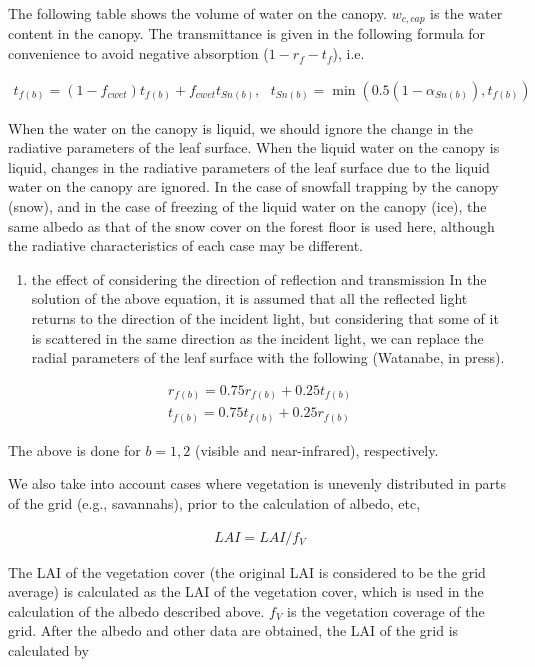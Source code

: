 The following table shows the volume of water on the canopy.
\(w_{c,cap}\) is the water content in the canopy. The transmittance is
given in the following formula for convenience to avoid negative
absorption (\(1-r_f-t_f\)), i.e.

\begin{eqnarray}
 t_{f(b)} = ( 1 - f_{cwet} ) t_{f(b)}
         + f_{cwet} t_{Sn(b)}, \ \ \
 t_{Sn(b)} = \min( 0.5(1 - \alpha_{Sn(b)}), t_{f(b)} )
\end{eqnarray}

When the water on the canopy is liquid, we should ignore the change in
the radiative parameters of the leaf surface. When the liquid water on
the canopy is liquid, changes in the radiative parameters of the leaf
surface due to the liquid water on the canopy are ignored. In the case
of snowfall trapping by the canopy (snow), and in the case of freezing
of the liquid water on the canopy (ice), the same albedo as that of the
snow cover on the forest floor is used here, although the radiative
characteristics of each case may be different.

\begin{enumerate}
\def\labelenumi{\arabic{enumi}.}
\setcounter{enumi}{1}
\tightlist
\item
  the effect of considering the direction of reflection and transmission
  In the solution of the above equation, it is assumed that all the
  reflected light returns to the direction of the incident light, but
  considering that some of it is scattered in the same direction as the
  incident light, we can replace the radial parameters of the leaf
  surface with the following (Watanabe, in press).
\end{enumerate}

\begin{eqnarray}
  r_{f(b)} = 0.75 r_{f(b)} + 0.25 t_{f(b)} \\
  t_{f(b)} = 0.75 t_{f(b)} + 0.25 r_{f(b)}
\end{eqnarray}

The above is done for \(b=1, 2\) (visible and near-infrared),
respectively.

We also take into account cases where vegetation is unevenly distributed
in parts of the grid (e.g., savannahs), prior to the calculation of
albedo, etc,

\begin{eqnarray}
  LAI = LAI / f_V
\end{eqnarray}

The LAI of the vegetation cover (the original LAI is considered to be
the grid average) is calculated as the LAI of the vegetation cover,
which is used in the calculation of the albedo described above. \(f_V\)
is the vegetation coverage of the grid. After the albedo and other data
are obtained, the LAI of the grid is calculated by

